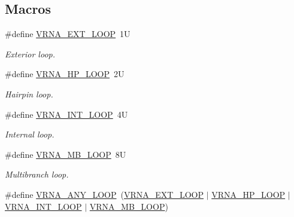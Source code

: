 \subsection*{Macros}
\begin{DoxyCompactItemize}
\item 
\mbox{\label{group__part__func__window_gaf0bb577130090f6c856d1358804250bf}} 
\#define \hyperlink{group__part__func__window_gaf0bb577130090f6c856d1358804250bf}{V\+R\+N\+A\+\_\+\+E\+X\+T\+\_\+\+L\+O\+OP}~1U
\begin{DoxyCompactList}\small\item\em Exterior loop. \end{DoxyCompactList}\item 
\mbox{\label{group__part__func__window_ga30170811c320f3a7b23ffff3b3343b91}} 
\#define \hyperlink{group__part__func__window_ga30170811c320f3a7b23ffff3b3343b91}{V\+R\+N\+A\+\_\+\+H\+P\+\_\+\+L\+O\+OP}~2U
\begin{DoxyCompactList}\small\item\em Hairpin loop. \end{DoxyCompactList}\item 
\mbox{\label{group__part__func__window_ga956a237e7d956b684b7d593cb3eca665}} 
\#define \hyperlink{group__part__func__window_ga956a237e7d956b684b7d593cb3eca665}{V\+R\+N\+A\+\_\+\+I\+N\+T\+\_\+\+L\+O\+OP}~4U
\begin{DoxyCompactList}\small\item\em Internal loop. \end{DoxyCompactList}\item 
\mbox{\label{group__part__func__window_gad905b71f02b3799eb84b490435aec837}} 
\#define \hyperlink{group__part__func__window_gad905b71f02b3799eb84b490435aec837}{V\+R\+N\+A\+\_\+\+M\+B\+\_\+\+L\+O\+OP}~8U
\begin{DoxyCompactList}\small\item\em Multibranch loop. \end{DoxyCompactList}\item 
\mbox{\label{group__part__func__window_ga1fef1ad234755db78ab6b695edce5080}} 
\#define \hyperlink{group__part__func__window_ga1fef1ad234755db78ab6b695edce5080}{V\+R\+N\+A\+\_\+\+A\+N\+Y\+\_\+\+L\+O\+OP}~(\hyperlink{group__part__func__window_gaf0bb577130090f6c856d1358804250bf}{V\+R\+N\+A\+\_\+\+E\+X\+T\+\_\+\+L\+O\+OP} $\vert$ \hyperlink{group__part__func__window_ga30170811c320f3a7b23ffff3b3343b91}{V\+R\+N\+A\+\_\+\+H\+P\+\_\+\+L\+O\+OP} $\vert$ \hyperlink{group__part__func__window_ga956a237e7d956b684b7d593cb3eca665}{V\+R\+N\+A\+\_\+\+I\+N\+T\+\_\+\+L\+O\+OP} $\vert$ \hyperlink{group__part__func__window_gad905b71f02b3799eb84b490435aec837}{V\+R\+N\+A\+\_\+\+M\+B\+\_\+\+L\+O\+OP})

\end{DoxyCompactItemize}

